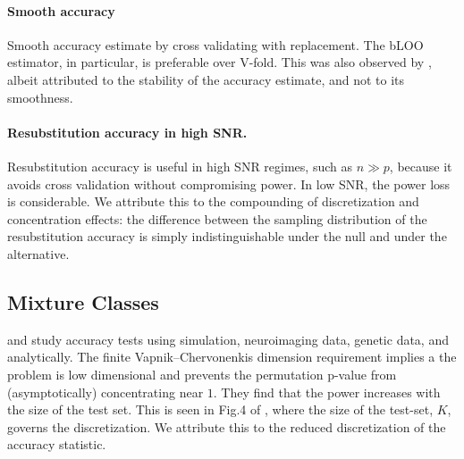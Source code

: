 \documentclass[journal]{IEEEtran}
\begin{document}
\paragraph{Smooth accuracy}
Smooth accuracy estimate by cross validating with replacement. 
The bLOO estimator, in particular, is preferable over V-fold.
This was also observed by \cite{yu2007two}, albeit attributed to the stability of the accuracy estimate, and not to its smoothness. 


\paragraph{Resubstitution accuracy in high SNR.} 
Resubstitution accuracy is useful in high SNR regimes, such as $n \gg p$, because it avoids cross validation without compromising power. 
In low SNR, the power loss is considerable. 
We attribute this to the compounding of discretization and concentration effects: the difference between the sampling distribution of the resubstitution accuracy is simply indistinguishable under the null and under the alternative. 



\subsection{Mixture Classes}

\cite{golland_permutation_2003} and \cite{golland_permutation_2005} study accuracy tests using simulation, neuroimaging data, genetic data, and analytically.
The finite Vapnik–Chervonenkis dimension requirement \cite[Sec 4.3]{golland_permutation_2005} implies a the problem is low dimensional and prevents the permutation p-value from (asymptotically) concentrating near $1$. 
They find that the power increases with the size of the test set.
This is seen in Fig.4 of \cite{golland_permutation_2005}, where the size of the test-set, $K$, governs the discretization. 
We attribute this to the reduced discretization of the accuracy statistic.
\end{document}
